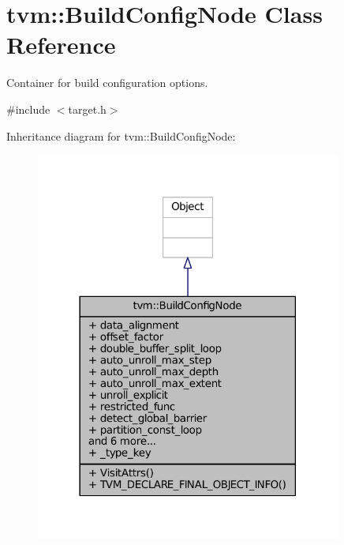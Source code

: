 \hypertarget{classtvm_1_1BuildConfigNode}{}\section{tvm\+:\+:Build\+Config\+Node Class Reference}
\label{classtvm_1_1BuildConfigNode}


Container for build configuration options.  




{\ttfamily \#include $<$target.\+h$>$}



Inheritance diagram for tvm\+:\+:Build\+Config\+Node\+:
\nopagebreak
\begin{figure}[H]
\begin{center}
\leavevmode
\includegraphics[width=285pt]{classtvm_1_1BuildConfigNode__inherit__graph}
\end{center}
\end{figure}


